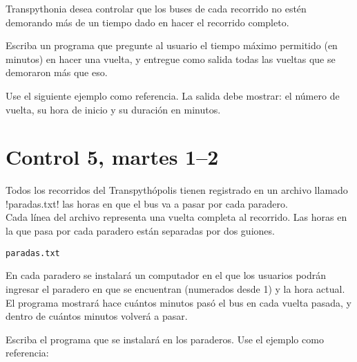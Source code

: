 \documentclass[12pt,spanish,a5paper,landscape]{article}
\begin{document}
  Transpythonia desea controlar que los buses de cada recorrido
  no estén demorando más de un tiempo dado
  en hacer el recorrido completo.

  Escriba un programa que pregunte al usuario
  el tiempo máximo permitido (en minutos)
  en hacer una vuelta,
  y entregue como salida todas las vueltas
  que se demoraron más que eso.

  Use el siguiente ejemplo como referencia.
  La salida debe mostrar:
  el número de vuelta,
  su hora de inicio
  y su duración en minutos.

  \begin{minipage}[t]{0.6\textwidth}
    
  \end{minipage}

  \newpage

  \part*{Control 5, martes 1--2}
  \newpage

  \begin{minipage}[t]{0.45\textwidth}
    Todos los recorridos del Transpythópolis
    tienen registrado en un archivo llamado \li!paradas.txt!
    las horas en que el bus va a pasar por cada paradero.
    \\[2ex]
    Cada línea del archivo representa
    una vuelta completa al recorrido.
    Las horas en la que pasa por cada paradero
    están separadas por dos guiones.
  \end{minipage}
  \hfill
  \begin{minipage}[t]{0.45\textwidth}
    \hfil\verb!paradas.txt!\hfil
    \small
    
  \end{minipage}

  En cada paradero se instalará un computador
  en el que los usuarios podrán ingresar
  el paradero en que se encuentran (numerados desde 1)
  y la hora actual.
  El programa mostrará
  hace cuántos minutos pasó el bus en cada vuelta pasada,
  y dentro de cuántos minutos volverá a pasar.

  Escriba el programa que se instalará en los paraderos.
  Use el ejemplo como referencia:

  \begin{minipage}[t]{0.6\textwidth}
    
  \end{minipage}
\end{document}
